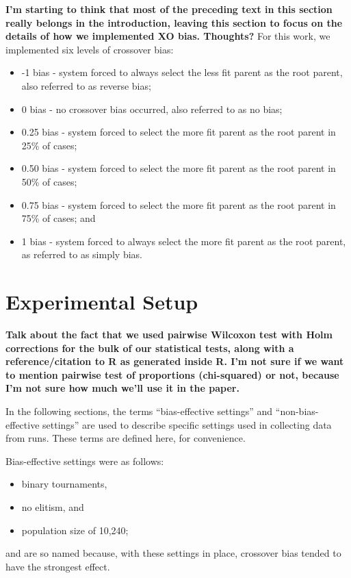 \documentclass{sig-alternate}
\begin{document}
\textbf{I'm starting to think that most of the preceding text in this section really belongs in the introduction, leaving this section to focus on the details of how we implemented XO bias. Thoughts?}
For this work, we implemented six levels of crossover bias:
\begin{itemize}
\item -1 bias - system forced to always select the less fit parent as the root parent, also referred to as reverse bias;
\item 0 bias - no crossover bias occurred, also referred to as no bias;
\item 0.25 bias - system forced to select the more fit parent as the root parent in 25\% of cases;
\item 0.50 bias - system forced to select the more fit parent as the root parent in 50\% of cases;
\item 0.75 bias - system forced to select the more fit parent as the root parent in 75\% of cases; and
\item 1 bias - system forced to always select the more fit parent as the root parent, as referred to as simply bias.
\end{itemize}

\section{Experimental Setup} \label{sec:Experiments}

\textbf{Talk about the fact that we used pairwise Wilcoxon test with Holm corrections for the bulk of our statistical 
tests, along with a reference/citation to R as generated inside R. I'm not sure if we want to mention pairwise test of 
proportions (chi-squared) or not, because I'm not sure how much we'll use it in the paper.}

In the following sections, the terms ``bias-effective settings'' and ``non-bias-effective settings'' are used to
describe specific settings used in collecting data from runs. These terms are defined here, for convenience.

Bias-effective settings were as follows:
\begin{itemize}
\item binary tournaments,
\item no elitism, and
\item population size of 10,240;
\end{itemize}
and are so named because, with these settings in place, crossover bias tended to have the strongest effect.
\end{document}
